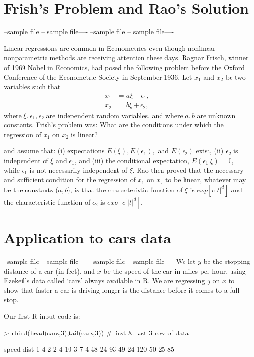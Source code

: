 \documentclass[12pt]{article}
\begin{document}
\section{Frish's Problem and Rao's Solution}
--sample file -- sample file----
--sample file -- sample file----

Linear regressions are common in Econometrics even though
nonlinear nonparametric methods are receiving attention these days.
Ragnar Frisch, winner of 1969 Nobel in Economics,
had posed the following problem before the
Oxford Conference of the Econometric Society in September 1936. Let
$x_1$ and $x_2$ be two variables such that
\begin{eqnarray}
\label{eq.frisch}
x_1 &= a \xi + \epsilon_1, \nonumber \\
x_2 &= b \xi + \epsilon_2,
\end{eqnarray}
where $\xi, \epsilon_1, \epsilon_2$ are independent random variables,
and where $a, b$ are unknown constants.  Frish's problem
was: What are the conditions under which the regression of $x_1$ on
$x_2$ is linear?


\cite{Rao47} and \cite{Rao49} 
assume that: (i) expectations $E(\xi), E(\epsilon_1),$ 
and $E(\epsilon_2)$ exist, (ii) $\epsilon_2$ is independent of $\xi$ and $\epsilon_1$,
and (iii) the conditional expectation, $E(\epsilon_1 |\xi)=0$, while $\epsilon_1$ is not necessarily
independent of $\xi$.  Rao then proved that
the necessary and sufficient condition for
the regression of $x_1$ on
$x_2$ to be linear, whatever may be the constants ($a, b$), is that
the characteristic function of  $\xi$ is $exp[c|t|^d]$ 
and the characteristic function of  $\epsilon_2$ is $exp[c^\prime|t|^d]$.

\section{Application to cars data}
--sample file -- sample file----
--sample file -- sample file----
We let $y$ be the stopping distance of a car (in feet),
and $x$ be the speed of the car in miles per hour, using 
Ezekeil's data called `cars' always available in R. 
We are regressing $y$ on $x$ to show that faster a car is driving
longer is the distance before it comes to a full stop.

Our first R input code is:

\begin{Schunk}
\begin{Sinput}
> rbind(head(cars,3),tail(cars,3)) # first \& last 3 row of data
\end{Sinput}
\begin{Soutput}
   speed dist
1      4    2
2      4   10
3      7    4
48    24   93
49    24  120
50    25   85
\end{Soutput}
\end{Schunk}
\end{document}
